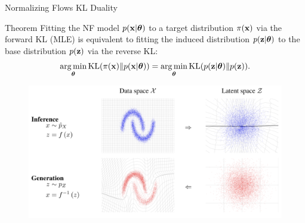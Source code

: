 \documentclass{beamer}
\begin{document}
\begin{frame}{Normalizing Flows KL Duality}
	\begin{block}{Theorem}
		Fitting the NF model $p(\mathbf{x}| \boldsymbol{\theta})$ to a target distribution $\pi(\mathbf{x})$ via the forward KL (MLE) is equivalent to fitting the induced distribution $p(\mathbf{z}| \boldsymbol{\theta})$ to the base distribution $p(\mathbf{z})$ via the reverse KL:
		\vspace{-0.2cm}
        \[
			\operatorname*{arg\,min}_{\boldsymbol{\theta}} \mathrm{KL}(\pi(\mathbf{x}) \| p(\mathbf{x} | \boldsymbol{\theta})) = \operatorname*{arg\,min}_{\boldsymbol{\theta}} \mathrm{KL}(p(\mathbf{z} | \boldsymbol{\theta}) \| p(\mathbf{z})).
		\]
		\vspace{-0.9cm}
	\end{block}
	
	\begin{figure}
		\includegraphics[width=0.85\linewidth]{figs/flows_how2}
	\end{figure}
\end{frame}
\end{document}
